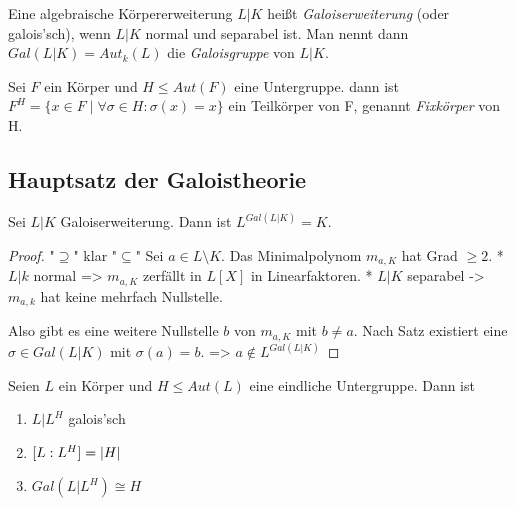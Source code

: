\documentclass[../main.tex]{subfiles}
\begin{document}
\begin{definition}
    Eine algebraische Körpererweiterung $L|K$ heißt \emph{Galoiserweiterung} (oder galois'sch), wenn $L|K$ normal und separabel ist.
    Man nennt dann $Gal(L|K) = Aut_k(L)$ die \emph{Galoisgruppe} von $L|K$.

    Sei $F$ ein Körper und $H\leq Aut(F)$ eine Untergruppe.
    dann ist $F^H = \{x\in F\mid \forall\sigma\in H:\sigma(x) = x\}$ ein Teilkörper von F, genannt \emph{Fixkörper} von H.
\end{definition}
\subsection{Hauptsatz der Galoistheorie}
\begin{lemma}
    Sei $L|K$ Galoiserweiterung. Dann ist $L^{Gal(L|K)} = K$.
\end{lemma}
\begin{proof}
    "$\supseteq$" klar
    "$\subseteq$" Sei $a\in L\setminus K$. Das Minimalpolynom $m_{a,K}$ hat Grad $\geq2$.
    * $L|k$ normal => $m_{a,K}$ zerfällt in $L[X]$ in Linearfaktoren.
    * $L|K$ separabel -> $m_{a,k}$ hat keine mehrfach Nullstelle.

    Also gibt es eine weitere Nullstelle $b$ von $m_{a,K}$ mit $b\neq a$.
    Nach Satz  existiert eine $\sigma \in Gal(L|K)$ mit $\sigma(a)=b$.
    => $a\notin L^{Gal(L|K)}$
\end{proof}
\begin{theorem}
    Seien $L$ ein Körper und $H\leq Aut(L)$ eine eindliche Untergruppe.
    Dann ist
    \begin{enumerate}
        \item $L|L^H$ galois'sch
        \item $[L:L^H] = \left\vert H \right\vert$
        \item $Gal(L|L^H)\cong H$
    \end{enumerate}
\end{theorem}
\end{document}
